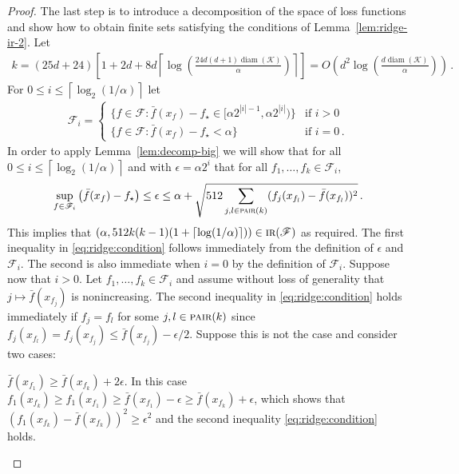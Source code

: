 \documentclass[letter, 12pt]{report}
\newcommand{\ceil}[1]{\left\lceil #1 \right\rceil}
\newcommand{\pair}{\operatorname{\textsc{pair}}}
\newcommand{\cK}{\mathcal K}
\newcommand{\sF}{\mathscr F}
\newcommand{\diam}{\operatorname{diam}}
\newcommand{\1}{\mathbf{1}}
\newcommand{\IR}{\operatorname{\textsc{ir}}}
\theoremstyle{plain}
\theoremstyle{definition}
\theoremstyle{remark}
\begin{document}
\begin{proof}
    The last step is to introduce a decomposition of the space of loss functions and show how to obtain finite sets satisfying
    the conditions of Lemma~\ref{lem:ridge-ir-2}.
    Let
    \begin{align*}
        k = (25d + 24)\left[1 + 2d + 8d\ceil{\log\left(\frac{24d(d+1) \diam(\cK)}{\alpha}\right)}\right] = O\left(d^2 \log\left(\frac{d \diam(\cK)}{\alpha}\right)\right) \,.
    \end{align*}
    For $0 \leq i \leq \ceil{\log_2(1/\alpha)}$ let
    \begin{align*}
        \sF_i = \begin{cases}
                    \{f \in \sF : \bar f(x_f) - f_\star \in [\alpha 2^{|i|-1}, \alpha 2^{|i|})\} & \text{if } i > 0     \\
                    \{f \in \sF : \bar f(x_f) - f_\star < \alpha\}                               & \text{if } i = 0 \,.
                \end{cases}
    \end{align*}
    In order to apply Lemma~\ref{lem:decomp-big} we will show that for all $0 \leq i \leq \ceil{\log_2(1/\alpha)}$
    and with $\epsilon = \alpha 2^i$ that for all $f_1,\ldots,f_k \in \sF_i$,
    \begin{align}
        \sup_{f \in \sF_i} \left(\bar f(x_f) - f_\star\right) \leq \epsilon \leq \alpha + \sqrt{512 \sum_{j, l \in \pair(k)} (f_j(x_{f_l}) - \bar f(x_{f_l}))^2}\,.
        \label{eq:ridge:condition}
    \end{align}
    This implies that $(\alpha, 512k(k-1) (1 + \ceil{\log(1/\alpha)})) \in \IR(\sF)$ as required.
    The first inequality in \cref{eq:ridge:condition} follows immediately from the definition of $\epsilon$ and $\sF_i$. The second is also immediate when $i = 0$ by the definition of $\sF_i$.
    Suppose now that $i > 0$.
    Let $f_1,\ldots,f_k \in \sF_i$ and
    assume without loss of generality that $j \mapsto \bar f(x_{f_j})$ is nonincreasing.
    The second inequality in \cref{eq:ridge:condition} holds immediately if $f_j = f_l$ for some $j,l \in \pair(k)$ since $f_j(x_{f_l}) = f_j(x_{f_j}) \leq \bar f(x_{f_j}) - \epsilon/2$.
    Suppose this is not the case and consider two cases:
    \begin{enumcases}
        \item $\bar f(x_{f_1}) \geq \bar f(x_{f_k}) + 2\epsilon$. In this case
        $f_1(x_{f_k}) \geq f_1(x_{f_1}) \geq \bar f(x_{f_1}) - \epsilon \geq \bar f(x_{f_k}) + \epsilon$,
        which shows that $(f_1(x_{f_k}) - \bar f(x_{f_k}))^2 \geq \epsilon^2$ and the second inequality \cref{eq:ridge:condition} holds.

\end{enumcases}
\end{proof}
\end{document}
